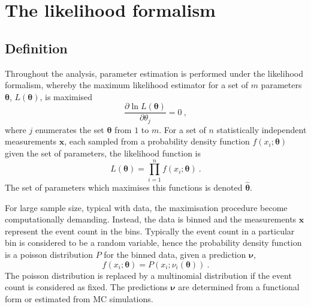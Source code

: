 \chapter{The likelihood formalism}\label{app:likelihood}

\section{Definition}

Throughout the analysis, parameter estimation is performed under the likelihood formalism, whereby the maximum likelihood estimator for a set of $m$ parameters $\bm{\theta}$, $L(\bm{\theta})$, is maximised
%
\begin{equation}
    \frac{\partial \ln L(\bm{\theta})}{\partial \theta_j} = 0\ ,
\end{equation}
%
where $j$ enumerates the set $\bm{\theta}$ from $1$ to $m$. For a set of $n$ statistically independent measurements $\bm{x}$, each sampled from a probability density function $f(x_i;\bm{\theta})$ given the set of parameters, the likelihood function is
%
\begin{equation}
    L(\bm{\theta}) = \prod_{i=1}^{n}f(x_i;\bm{\theta})\ .
\end{equation}
%
The set of parameters which maximises this functions is denoted $\hat{\bm{\theta}}$.

For large sample size, typical with \CMS data, the maximisation procedure become computationally demanding. Instead, the data is binned and the measurements $\bm{x}$ represent the event count in the bins. Typically the event count in a particular bin is considered to be a random variable, hence the probability density function is a poisson distribution $P$ for the binned data, given a prediction $\bm{\nu}$,
%
\begin{equation}
    f(x_i;\bm{\theta}) = P(x_i;\nu_i(\bm{\theta}))\ .
\end{equation}
%
The poisson distribution is replaced by a multinomial distribution if the event count is considered as fixed. The predictions $\bm{\nu}$ are determined from a functional form or estimated from MC simulations.

